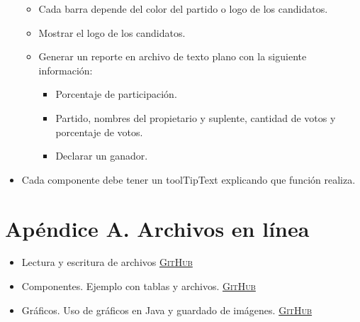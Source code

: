 \documentclass[11pt,a4paper]{article}
\begin{document}
\begin{itemize}
\begin{itemize}
\item Cada barra depende del color del partido o logo de los candidatos.
\item Mostrar el logo de los candidatos.
\item Generar un reporte en archivo de texto plano con la siguiente información:
\begin{itemize}
\item Porcentaje de participación.
\item Partido, nombres del propietario y suplente, cantidad de votos y porcentaje de votos.
\item Declarar un ganador.
\end{itemize}
\end{itemize} 
\item Cada componente debe tener un \textsf{toolTipText} explicando que función realiza.
\end{itemize}
\newpage


\section{Apéndice A. Archivos en línea}

\begin{itemize}
\item Lectura y escritura de archivos \href{https://github.com/eduardoschz/LaTex/tree/master/Cursos\%202018-2/GUI/GUI_Archivos}{\textsc{GitHub}}
\item  Componentes. Ejemplo con tablas y archivos. \href{https://github.com/eduardoschz/LaTex/tree/master/Cursos\%202018-2/GUI/GUI_Componentes}{\textsc{GitHub}}
\item Gráficos. Uso de gráficos en \textsf{Java} y guardado de imágenes. \href{https://github.com/eduardoschz/LaTex/tree/master/Cursos\%202018-2/GUI/GUI_Graficos}{\textsc{GitHub}}
\end{itemize}

\newpage


\newpage


\end{document}
